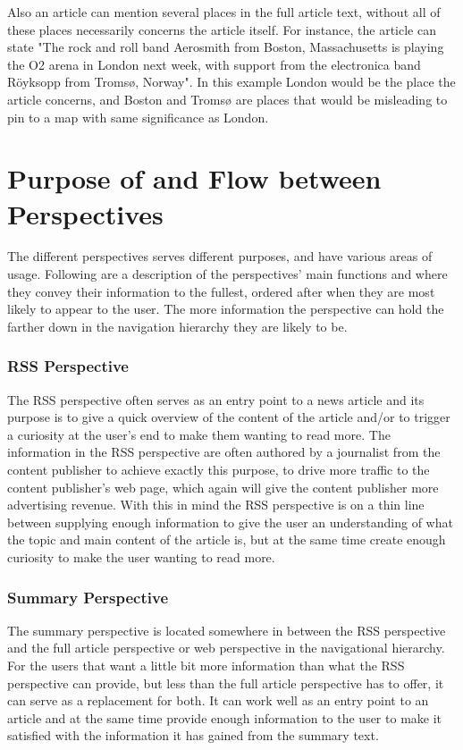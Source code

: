 Also an article can mention several places in the full article text, without all of these places necessarily concerns the article itself. For instance, the article can state "The rock and roll band Aerosmith from Boston, Massachusetts is playing the O2 arena in London next week, with support from the electronica band Röyksopp from Tromsø, Norway". In this example London would be the place the article concerns, and Boston and Tromsø are places that would be misleading to pin to a map with same significance as London.


\section{Purpose of and Flow between Perspectives}
The different perspectives serves different purposes, and have various areas of usage. Following are a description of the perspectives' main functions and where they convey their information to the fullest, ordered after when they are most likely to appear to the user. The more information the perspective can hold the farther down in the navigation hierarchy they are likely to be.


\subsubsection{RSS Perspective}
The RSS perspective often serves as an entry point to a news article and its purpose is to give a quick overview of the content of the article and/or to trigger a curiosity at the user's end to make them wanting to read more. The information in the RSS perspective are often authored by a journalist from the content publisher to achieve exactly this purpose, to drive more traffic to the content publisher's web page, which again will give the content publisher more advertising revenue. With this in mind the RSS perspective is on a thin line between supplying enough information to give the user an understanding of what the topic and main content of the article is, but at the same time create enough curiosity to make the user wanting to read more.

\subsubsection{Summary Perspective}
The summary perspective is located somewhere in between the RSS perspective and the full article perspective or web perspective in the navigational hierarchy. For the users that want a little bit more information than what the RSS perspective can provide, but less than the full article perspective has to offer, it can serve as a replacement for both. It can work well as an entry point to an article and at the same time provide enough information to the user to make it satisfied with the information it has gained from the summary text. 

